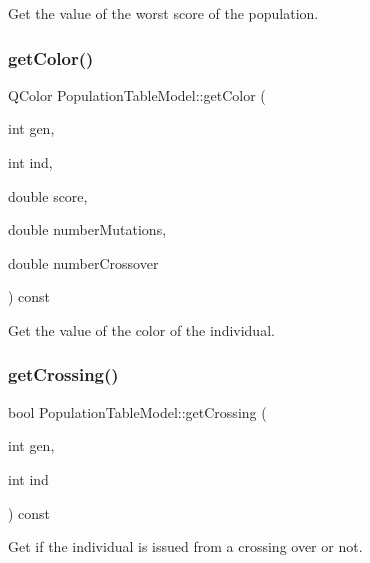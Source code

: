 Get the value of the worst score of the population. 

\mbox{\label{class_population_table_model_a0884595d8787c90834612286bb075b08}} 
\subsubsection{\texorpdfstring{get\+Color()}{getColor()}}
{\footnotesize\ttfamily Q\+Color Population\+Table\+Model\+::get\+Color (\begin{DoxyParamCaption}\item[{int}]{gen,  }\item[{int}]{ind,  }\item[{double}]{score,  }\item[{double}]{number\+Mutations,  }\item[{double}]{number\+Crossover }\end{DoxyParamCaption}) const}



Get the value of the color of the individual. 

\mbox{\label{class_population_table_model_a0b3905d7e1fc17abc89551439bcdd646}} 
\subsubsection{\texorpdfstring{get\+Crossing()}{getCrossing()}}
{\footnotesize\ttfamily bool Population\+Table\+Model\+::get\+Crossing (\begin{DoxyParamCaption}\item[{int}]{gen,  }\item[{int}]{ind }\end{DoxyParamCaption}) const}



Get if the individual is issued from a crossing over or not. 

\mbox{\label{class_population_table_model_a935108bb7a97dab519fc437a67c11d26}} 
